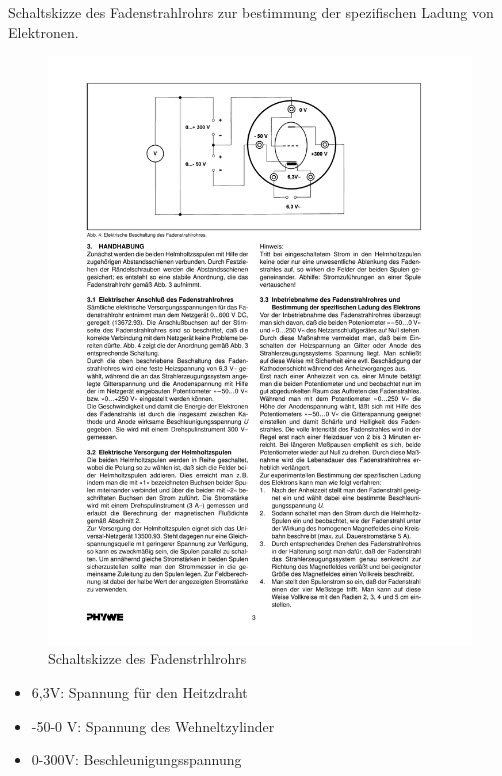 \documentclass[12pt,a4paper]{article}
\begin{document}
Schaltskizze des Fadenstrahlrohrs zur bestimmung der spezifischen Ladung von Elektronen.

\begin{figure}[H] 
  \centering
    \includegraphics[trim = 10mm 210mm 10mm 10mm, clip, scale = 1]{fadenstrahlrohr.pdf}
  	\caption[Schaltskizze des Fadenstrhlrohrs]{Schaltskizze des Fadenstrhlrohrs\footnotemark}
  \label{fig:aufbau_h}
\end{figure}

\begin{itemize}
\item	6,3V:		Spannung für den Heitzdraht

\item	-50-0 V:	Spannung des Wehneltzylinder

\item	0-300V:		Beschleunigungsspannung
\end{itemize}
\end{document}
